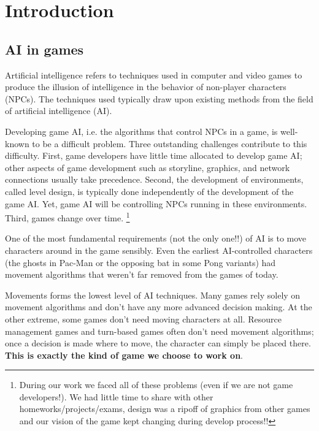 \chapter{Introduction}

\section{AI in games}

Artificial intelligence refers to techniques used in computer and video games to produce the illusion of intelligence in the behavior of non-player characters (NPCs). The techniques used typically draw upon existing methods from the field of artificial intelligence (AI).

Developing game AI, i.e. the algorithms that control NPCs in a game, is well-known to be a difficult problem. Three outstanding challenges contribute to this difficulty. 
First, game developers have little time allocated to develop game AI; other aspects of game development such as storyline, graphics, and network connections usually take precedence. Second, the development of environments, called level design, is typically done independently of the development of the game AI. Yet, game AI will be controlling NPCs running in these environments. Third, games change over time.
\footnote{During our work we faced all of these problems (even if we are not game developers!). We had little time to share with other homeworks/projects/exams, design was a ripoff of graphics from other games and our vision of the game kept changing during develop process!!}

One of the most fundamental requirements (not the only one!!) of AI is to move characters around in the game sensibly. Even the earliest AI-controlled characters (the ghosts in Pac-Man or the opposing bat in some Pong variants) had movement algorithms that weren’t far removed from the games of today.

Movements forms the lowest level of AI techniques. Many games rely solely on movement algorithms and don’t have any more advanced decision making. At the other extreme, some games don’t need moving characters at all. Resource management games and turn-based games often don’t need movement algorithms; once a decision is made where to move, the character can simply be placed there.
\textbf{This is exactly the kind of game we choose to work on}.

